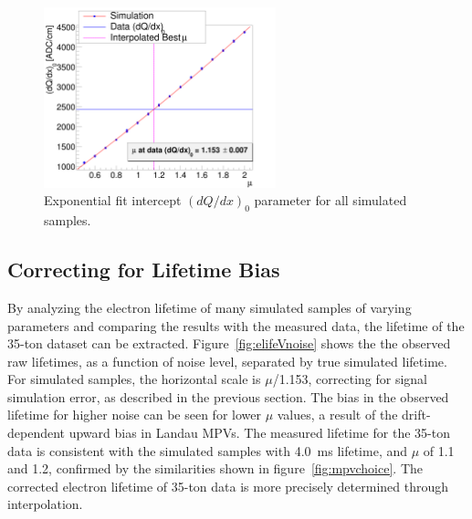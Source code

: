 \documentclass[10pt,a4paper]{article}
\begin{document}
\begin{figure}
\centering
\includegraphics[width=0.6\textwidth]{canvdqdx0.png}
\caption{Exponential fit intercept $(dQ/dx)_0$ parameter for all simulated samples.}
\label{fig:dqdx0scale} 
\end{figure}

\subsection{Correcting for Lifetime Bias}\label{sec:debiasing}

By analyzing the electron lifetime of many simulated samples of varying parameters and comparing the results with the measured data, the lifetime of the 35-ton dataset can be extracted. Figure~\ref{fig:elifeVnoise} shows the the observed raw lifetimes, as a function of noise level, separated by true simulated lifetime. For simulated samples, the horizontal scale is $\mu$/1.153, correcting for signal simulation error, as described in the previous section. The bias in the observed lifetime for higher noise can be seen for lower $\mu$ values, a result of the drift-dependent upward bias in Landau MPVs. The measured lifetime for the 35-ton data is consistent with the simulated samples with 4.0~ms lifetime, and $\mu$ of 1.1 and 1.2, confirmed by the similarities shown in figure~\ref{fig:mpvchoice}. The corrected electron lifetime of 35-ton data is more precisely determined through interpolation.
\end{document}
